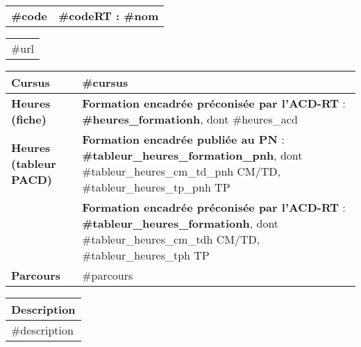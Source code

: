  \label{subsubsec:#codelatex}


\setlength{\tabcolsep}{0.125cm} %
\setlength{\extrarowheight}{2pt} %


\begin{tabular}[t]{|P|T|}
\hline %
	 \textcolor{compCAp!20!white}{\bfseries \hypertarget{#codelatex}{#code}}
    &  \textcolor{compCAp!20!white}{\bfseries #codeRT : #nom }
\\
\end{tabular}

\begin{tabular}[t]{|G|}
\hline %
	#url
\\
\end{tabular}

\begin{tabular}[t]{|P|T|}
\hline %
	\textcolor{ressourceC}{\bfseries Cursus}
	& #cursus \\
\hline %
\hline
    \textcolor{ressourceC}{\bfseries Heures (fiche)}
    &
    \textcolor{ressourceC}{\bfseries Formation encadrée préconisée par l'ACD-RT} : {\bfseries {#heures_formation}h}, dont {#heures_acd} \\
\hline
\hline
    \textcolor{ressourceC}{\bfseries Heures (tableur PACD)}
    &
    \textcolor{ressourceC}{\bfseries Formation encadrée publiée au PN} : {\bfseries {#tableur_heures_formation_pn}h}, dont {#tableur_heures_cm_td_pn}h CM/TD, {#tableur_heures_tp_pn}h TP \\ %
    &
    \textcolor{ressourceC}{\bfseries Formation encadrée préconisée par l'ACD-RT} : {\bfseries {#tableur_heures_formation}h}, dont {#tableur_heures_cm_td}h CM/TD, {#tableur_heures_tp}h TP \\
\hline
\hline %
	\textcolor{ressourceC}{\bfseries Parcours}
	& #parcours \\
\hline
\end{tabular}

\begin{tabular}{|G|}
	\hline
	\textcolor{ressourceC}{\bfseries Description} \\
	\hline
    #description \\
\hline
\end{tabular}

